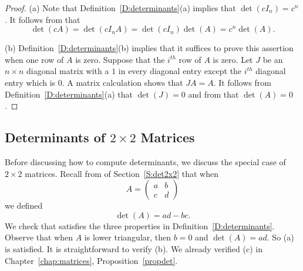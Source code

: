 \documentclass{ximera}
\begin{document}
\begin{proof}  (a) Note that Definition~\ref{D:determinants}(a) implies that 
$\det(cI_n)=c^n$.  It follows from  that
\[
\det(cA) = \det(cI_n A) = \det(cI_n)\det(A) = c^n\det(A).
\]

(b)  Definition~\ref{D:determinants}(b) implies that it suffices to prove 
this assertion when one row of $A$ is zero.  Suppose that the $i^{th}$ row 
of $A$ is zero.  Let $J$ be an $n\times n$ 
diagonal matrix with a $1$ in every diagonal entry except the $i^{th}$ 
diagonal entry which is $0$.  A matrix calculation shows that $JA=A$. 
It follows from Definition~\ref{D:determinants}(a) that $\det(J)=0$ and 
from  that $\det(A)=0$.  \end{proof} 



\subsection*{Determinants of $2\times 2$ Matrices}
 
Before discussing how to compute determinants, we discuss the
special case of $2\times 2$ matrices.  Recall from  of 
Section~\ref{S:det2x2} that when 
\[
A=\left(\begin{array}{cc} a & b\\c & d \end{array}\right)
\]
we defined 
\begin{equation}  \label{e:determinantn=2}
\det(A)=ad-bc.
\end{equation}
We check that  satisfies the three
properties in Definition~\ref{D:determinants}.  Observe that when
$A$ is lower triangular, then $b=0$ and $\det(A)=ad$.  So (a) is
satisfied.  It is straightforward to verify (b).  We already
verified (c) in Chapter~\ref{chap:matrices}, Proposition~\ref{propdet}.
\end{document}
